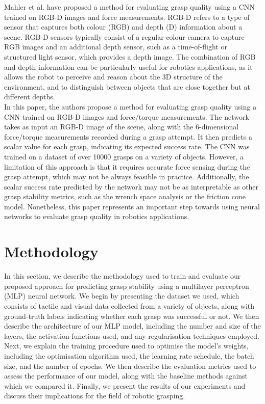 \documentclass[11pt, a4paper]{report}
\begin{document}
Mahler et al. have proposed a method for evaluating grasp quality using a CNN trained on RGB-D images and force measurements. RGB-D refers to a type of sensor that captures both colour (RGB) and depth (D) information about a scene. RGB-D sensors typically consist of a regular colour camera to capture RGB images and an additional depth sensor, such as a time-of-flight or structured light sensor, which provides a depth image. The combination of RGB and depth information can be particularly useful for robotics applications, as it allows the robot to perceive and reason about the 3D structure of the environment, and to distinguish between objects that are close together but at different depths.\\

In this paper, the authors propose a method for evaluating grasp quality using a CNN trained on RGB-D images and force/torque measurements. The network takes as input an RGB-D image of the scene, along with the 6-dimensional force/torque measurements recorded during a grasp attempt. It then predicts a scalar value for each grasp, indicating its expected success rate. The CNN was trained on a dataset of over 10000 grasps on a variety of objects. However, a limitation of this approach is that it requires accurate force sensing during the grasp attempt, which may not be always feasible in practice. Additionally, the scalar success rate predicted by the network may not be as interpretable as other grasp stability metrics, such as the wrench space analysis or the friction cone model. Nonetheless, this paper represents an important step towards using neural networks to evaluate grasp quality in robotics applications.


\newpage
\section{Methodology}\label{sec:5.2}
In this section, we describe the methodology used to train and evaluate our proposed approach for predicting grasp stability using a multilayer perceptron (MLP) neural network. We begin by presenting the dataset we used, which consists of tactile and visual data collected from a variety of objects, along with ground-truth labels indicating whether each grasp was successful or not. We then describe the architecture of our MLP model, including the number and size of the layers, the activation functions used, and any regularisation techniques employed. Next, we explain the training procedure used to optimise the model's weights, including the optimisation algorithm used, the learning rate schedule, the batch size, and the number of epochs. We then describe the evaluation metrics used to assess the performance of our model, along with the baseline methods against which we compared it. Finally, we present the results of our experiments and discuss their implications for the field of robotic grasping.
\end{document}
